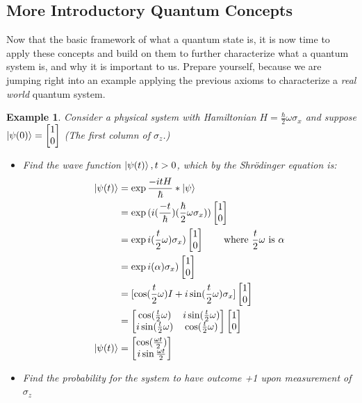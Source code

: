 \documentclass[12pt]{article}
\theoremstyle{plain}
\theoremstyle{nonumberplain}
\theoremstyle{plain}
\newtheorem{example}[lemma]{Example}
\theoremstyle{nonumberplain}
\newcommand\1{{\bf 1}}
\newcommand{\bmat}[1]{\begin{bmatrix*} #1 \end{bmatrix*}} %
\newcommand{\<}{\left\langle}
\renewcommand{\>}{\right\rangle}
\begin{document}
\subsection{More Introductory Quantum Concepts}
Now that the basic framework of what a quantum state is, it is now time to apply these concepts and build on them to further characterize what a quantum system is, and why it is important to us.  Prepare yourself, because we are jumping right into an example applying the previous axioms to characterize a \textit{real world} quantum system.\\
\begin{example}
Consider a physical system with Hamiltonian $H = \frac{\hbar}{2} \omega\sigma_x$ and suppose $\ket{\psi(0)} = \bmat{1\\ 0}$ (The first column of $\sigma_z$.)\\
\begin{itemize}
\item Find the wave function $\ket{\psi(t)}, t>0$, which by the Shrödinger equation is:\\
\begin{equation}
\begin{split}
\ket{\psi(t)} &= \exp{\frac{-itH}{\hbar}} * \ket{\psi}\\
&= \exp{(i(\frac{-t}{\hbar})(\frac{\hbar}{2}\omega\sigma_x))}\bmat{1\\0}\\
&= \exp{i(\frac{t}{2}\omega)\sigma_x)}\bmat{1\\0}\qquad \text{where $\frac{t}{2} \omega$ is $\alpha$}\\
&= \exp{i(\alpha)\sigma_x)}\bmat{1\\0}\\
&= [\cos(\frac{t}{2}\omega)I+i\sin(\frac{t}{2}\omega)\sigma_x]\bmat{1\\0}\\
&= \bmat{\cos(\frac{t}{2}\omega) &i\sin(\frac{t}{2}\omega)\\ i\sin(\frac{t}{2}\omega) &\cos(\frac{t}{2}\omega)}\bmat{1\\0}\\
\ket{\psi(t)} &= \bmat{\cos(\frac{\omega t}{2})\\ i\sin{\frac{\omega t}{2}}}
\end{split}
\end{equation}
\item Find the probability for the system to have outcome +1 upon measurement of $\sigma_z$\\
\begin{equation}

\end{equation}
\end{itemize}
\end{example}
\end{document}
